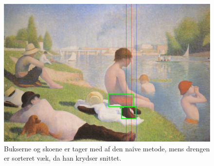 \begin{figure}[h!!]
	\begin{center}
		\includegraphics[scale=0.3,angle=0]{afsnit/afprovning/billeder/naive_losning/naiv_mfarver_mdetaljer.png}
	\end{center}
	\caption[]{Bukserne og skoene er tager med af den naive metode, mens
	drengen er sorteret væk, da han krydser snittet.}
	\label{naiv_mfarver_mdetaljer}
\end{figure}

